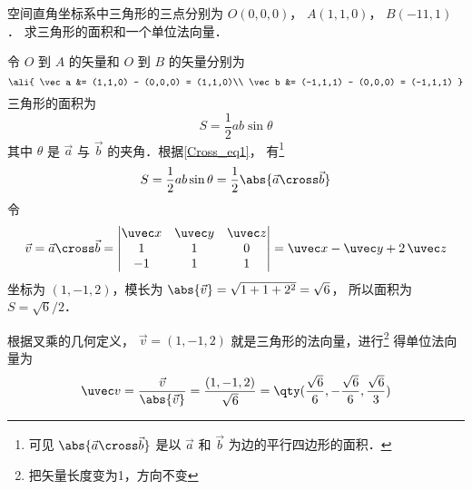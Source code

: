 \begin{exam}{}\label{Cross_exe1}
空间直角坐标系中三角形的三点分别为 $O(0,0,0)$，  $A(1,1,0)$，  $B(-11,1)$． 求三角形的面积和一个单位法向量．

令 $O$ 到 $A$ 的矢量和  $O$ 到 $B$ 的矢量分别为
\begin{equation}
\ali{
\vec a  &= (1,1,0) - (0,0,0) = (1,1,0)\\
\vec b  &= (-1,1,1) - (0,0,0) = (-1,1,1)
}\end{equation}
三角形的面积为
 \begin{equation}
S = \frac12 ab \sin \theta 
\end{equation}
其中 $\theta $ 是 $\vec a$ 与 $\vec b$ 的夹角．根据\autoref{Cross_eq1}， 有\footnote{可见 $\abs{\vec a\cross\vec b}$ 是以 $\vec a$ 和 $\vec b$ 为边的平行四边形的面积．}
\begin{equation}
S = \frac12 ab \sin \theta  = \frac12 \abs{\vec a\cross\vec b}
\end{equation}
令
\begin{equation}
\vec v = \vec a \cross \vec b = 
\begin{vmatrix} \uvec x & \uvec y & \uvec z \\ 1&1&0\\-1&1&1 \end{vmatrix}
= \uvec x - \uvec y + 2\,\uvec z 
\end{equation}
坐标为 $(1,-1,2)$，模长为 $\abs{\vec v} = \sqrt{1 + 1 + 2^2} = \sqrt 6$， 所以面积为 $S = \sqrt 6 /2$． 

根据叉乘的几何定义， $\vec v = (1,-1,2)$ 就是三角形的法向量，进行\footnote{把矢量长度变为1，方向不变}
得单位法向量为
 \begin{equation}
\uvec v = \frac{\vec v}{\abs{\vec v}} = \frac{(1,-1,2)}{\sqrt 6} = \qty( \frac{\sqrt 6 }{6}, - \frac{\sqrt 6 }{6}, \frac{\sqrt 6 }{3} )
\end{equation}
\end{exam}



